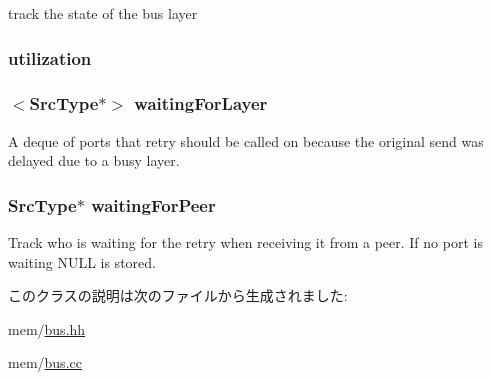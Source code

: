 \label{classBaseBus_1_1Layer_a876b486d3a5241a126bd5751c5f70f79}
track the state of the bus layer \hypertarget{classBaseBus_1_1Layer_a04353589e0e920909d3ceb8e73abb7ac}{
\subsubsection[{utilization}]{ {\bf utilization}}}
\label{classBaseBus_1_1Layer_a04353589e0e920909d3ceb8e73abb7ac}
\hypertarget{classBaseBus_1_1Layer_a8db23e62d084ba779ff42aacec39065d}{
\subsubsection[{waitingForLayer}]{$<$SrcType$\ast$$>$ {\bf waitingForLayer}}}
\label{classBaseBus_1_1Layer_a8db23e62d084ba779ff42aacec39065d}
A deque of ports that retry should be called on because the original send was delayed due to a busy layer. \hypertarget{classBaseBus_1_1Layer_ab8ea7bd13cb34352f935d08c989ab5e8}{
\subsubsection[{waitingForPeer}]{\setlength{\rightskip}{0pt plus 5cm}SrcType$\ast$ {\bf waitingForPeer}}}
\label{classBaseBus_1_1Layer_ab8ea7bd13cb34352f935d08c989ab5e8}
Track who is waiting for the retry when receiving it from a peer. If no port is waiting NULL is stored. 

このクラスの説明は次のファイルから生成されました:\begin{DoxyCompactItemize}
\item 
mem/\hyperlink{bus_8hh}{bus.hh}\item 
mem/\hyperlink{bus_8cc}{bus.cc}\end{DoxyCompactItemize}
